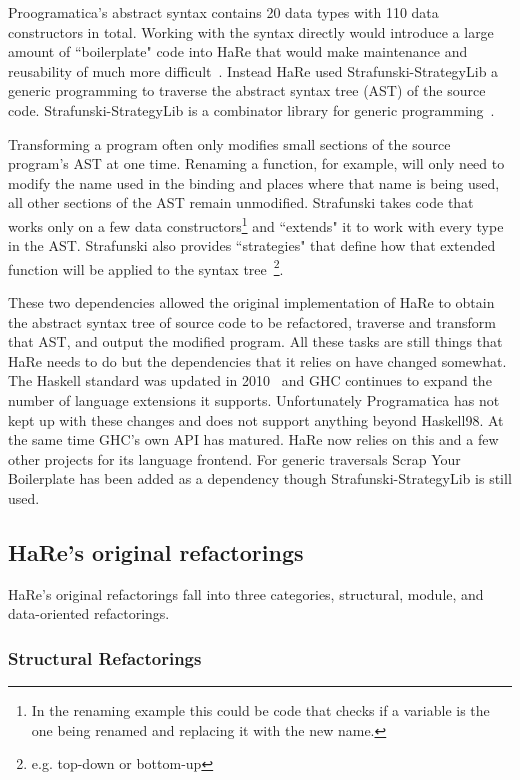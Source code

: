 Proogramatica's abstract syntax contains 20 data types with 110 data constructors in total. Working with the syntax directly would introduce a large amount of ``boilerplate" code into HaRe that would make maintenance and reusability of much more difficult~\citep{huiqingThesis}. Instead HaRe used Strafunski-StrategyLib a generic programming to traverse the abstract syntax tree (AST) of the source code. Strafunski-StrategyLib is a combinator library for generic programming~\citep{strafunski}. 

Transforming a program often only modifies small sections of the source program's AST at one time. Renaming a function, for example, will only need to modify the name used in the binding and places where that name is being used, all other sections of the AST remain unmodified. Strafunski takes code that works only on a few data constructors\footnote{In the renaming example this could be code that checks if a variable is the one being renamed and replacing it with the new name.} and ``extends" it to work with every type in the AST. Strafunski also provides ``strategies" that define how that extended function will be applied to the syntax tree~\citep{strafunski}\footnote{e.g. top-down or bottom-up}.

These two dependencies allowed the original implementation of HaRe to obtain the abstract syntax tree of source code to be refactored, traverse and transform that AST, and output the modified program. All these tasks are still things that HaRe needs to do but the dependencies that it relies on have changed somewhat. The Haskell standard was updated in 2010~\citep{haskell2010} and GHC continues to expand the number of language extensions it supports. Unfortunately Programatica has not kept up with these changes and does not support anything beyond Haskell98. At the same time GHC's own API has matured. HaRe now relies on this and a few other projects for its language frontend. For generic traversals Scrap Your Boilerplate has been added as a dependency though Strafunski-StrategyLib is still used.
 
\subsection{HaRe's original refactorings}\label{origRefactorings}

HaRe's original refactorings fall into three categories, structural, module, and data-oriented refactorings.

\subsubsection{Structural Refactorings}

